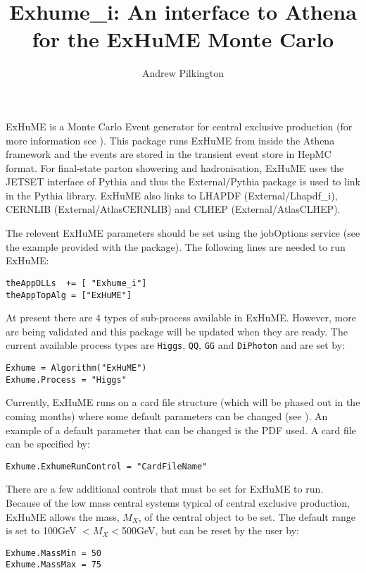 \documentclass[11pt]{article}
\title{Exhume\_i: An interface to Athena for the ExHuME Monte Carlo}
\author{Andrew Pilkington}
\begin{document}
\vspace{-3cm}
\maketitle

ExHuME is a Monte Carlo Event generator for central exclusive production (for more information see  \cite{exhume}). This package runs ExHuME from inside the Athena framework and the events are stored in the transient event store in HepMC format. For final-state parton showering and hadronisation, ExHuME uses the JETSET interface of Pythia and thus the External/Pythia package is used to link in the Pythia library. ExHuME also links to LHAPDF (External/Lhapdf\_i), CERNLIB (External/AtlasCERNLIB) and CLHEP (External/AtlasCLHEP).

The relevent ExHuME parameters should be set using the jobOptions service (see the example provided with the package). The following lines are needed to run ExHuME:
\begin{verbatim}
theAppDLLs  += [ "Exhume_i"]
theAppTopAlg = ["ExHuME"]
\end{verbatim}
At present there are 4 types of sub-process available in ExHuME. However, more are being validated and this package will be updated when they are ready. The current available process types are \texttt{Higgs}, \texttt{QQ}, \texttt{GG} and \texttt{DiPhoton} and are set by:
\begin{verbatim}
Exhume = Algorithm("ExHuME")
Exhume.Process = "Higgs"
\end{verbatim}
Currently, ExHuME runs on a card file structure (which will be phased out in the coming months) where some default parameters can be changed (see \cite{exhume}). An example of a default parameter that can be changed is the PDF used. A card file can be specified by:
\begin{verbatim}
Exhume.ExhumeRunControl = "CardFileName"
\end{verbatim}
There are a few additional controls that must be set for ExHuME to run. Because of the low mass central systems typical of central exclusive production, ExHuME allows the mass, $M_X$, of the central object to be set. The default range is set to 100GeV $< M_X < $500GeV, but can be reset by the user by:
\begin{verbatim}
Exhume.MassMin = 50
Exhume.MassMax = 75
\end{verbatim}
\end{document}
